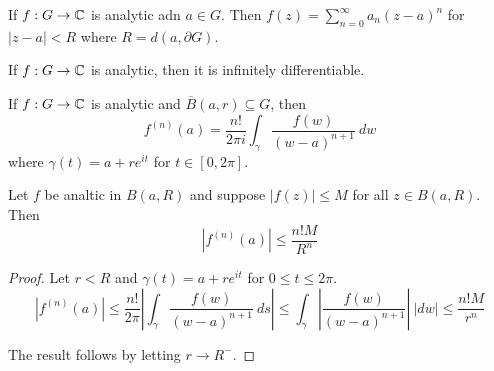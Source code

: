\begin{corollary}
    If $f: G\to\mathbb{C}$ is analytic adn $a\in G$. Then $f(z) = \sum\limits_{n = 0}^\infty a_n (z - a)^n$ for $|z - a| < R$ where $R = d(a,\partial G)$.
\end{corollary}

\begin{corollary}
    If $f: G\to\mathbb{C}$ is analytic, then it is infinitely differentiable.
\end{corollary}

\begin{corollary}
    If $f: G\to\mathbb{C}$ is analytic and $\overline B(a,r)\subseteq G$, then 
    \begin{equation*}
        f^{(n)}(a) = \frac{n!}{2\pi i}\int_\gamma\frac{f(w)}{(w - a)^{n + 1}}~dw
    \end{equation*}
    where $\gamma(t) = a + re^{it}$ for $t\in[0,2\pi]$.
\end{corollary}

\begin{proposition}
    Let $f$ be analtic in $B(a,R)$ and suppose $|f(z)|\le M$ for all $z\in B(a,R)$. Then 
    \begin{equation*}
        |f^{(n)}(a)|\le\frac{n!M}{R^n}
    \end{equation*}
\end{proposition}
\begin{proof}
    Let $r < R$ and $\gamma(t) = a + re^{it}$ for $0\le t\le 2\pi$.
    \begin{equation*}
        |f^{(n)}(a)|\le\frac{n!}{2\pi}\left|\int_\gamma\frac{f(w)}{(w - a)^{n + 1}}~ds\right|\le\int_\gamma\left|\frac{f(w)}{(w - a)^{n + 1}}\right|~|dw|\le\frac{n!M}{r^n}
    \end{equation*}

    The result follows by letting $r\to R^{-}$.
\end{proof}

